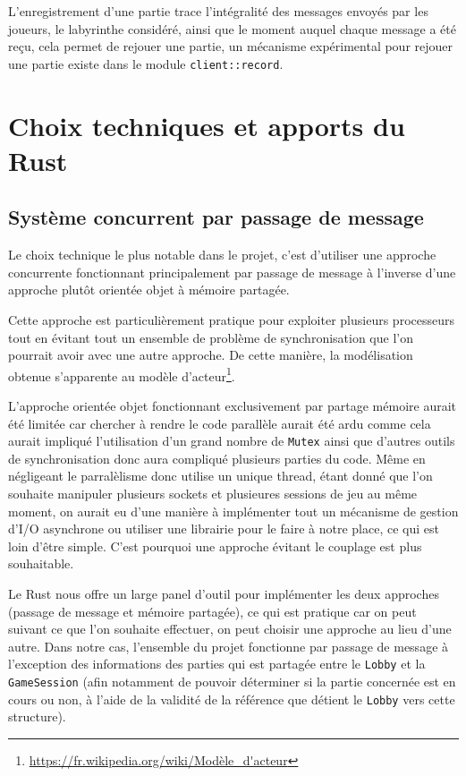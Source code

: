 \documentclass{EPUProjetDi}
\begin{document}
L'enregistrement d'une partie trace l'intégralité des messages envoyés par les joueurs, le labyrinthe considéré, ainsi que le moment auquel chaque message a été reçu, cela permet de rejouer une partie, un mécanisme expérimental pour rejouer une partie existe dans le module \verb|client::record|.

\chapter{Choix techniques et apports du Rust}

\section{Système concurrent par passage de message}

Le choix technique le plus notable dans le projet, c'est d'utiliser une approche concurrente fonctionnant principalement par passage de message à l'inverse d'une approche plutôt orientée objet à mémoire partagée.

Cette approche est particulièrement pratique pour exploiter plusieurs processeurs tout en évitant tout un ensemble de problème de synchronisation que l'on pourrait avoir avec une autre approche. De cette manière, la modélisation obtenue s'apparente au modèle d'acteur\footnote{\url{https://fr.wikipedia.org/wiki/Modèle_d'acteur}}.

L'approche orientée objet fonctionnant exclusivement par partage mémoire aurait été limitée car chercher à rendre le code parallèle aurait été ardu comme cela aurait impliqué l'utilisation d'un grand nombre de \verb|Mutex| ainsi que d'autres outils de synchronisation donc aura compliqué plusieurs parties du code. Même en négligeant le parralèlisme donc utilise un unique thread, étant donné que l'on souhaite manipuler plusieurs sockets et plusieures sessions de jeu au même moment, on aurait eu d'une manière à implémenter tout un mécanisme de gestion d'I/O asynchrone ou utiliser une librairie pour le faire à notre place, ce qui est loin d'être simple. C'est pourquoi une approche évitant le couplage est plus souhaitable.

Le Rust nous offre un large panel d'outil pour implémenter les deux approches (passage de message et mémoire partagée), ce qui est pratique car on peut suivant ce que l'on souhaite effectuer, on peut choisir une approche au lieu d'une autre. Dans notre cas, l'ensemble du projet fonctionne par passage de message à l'exception des informations des parties qui est partagée entre le \verb|Lobby| et la \verb|GameSession| (afin notamment de pouvoir déterminer si la partie concernée est en cours ou non, à l'aide de la validité de la référence que détient le \verb|Lobby| vers cette structure).
\end{document}
